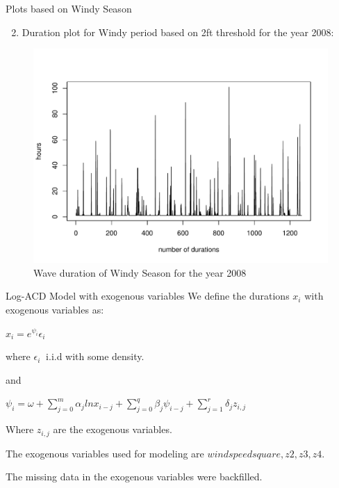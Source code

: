 \documentclass[
  ignorenonframetext,
]{beamer}
\providecommand{\tightlist}{%
  \setlength{\itemsep}{0pt}\setlength{\parskip}{0pt}}
\begin{document}
\begin{frame}{Plots based on Windy Season}
\protect\hypertarget{plots-based-on-windy-season}{}
\begin{enumerate}
[1)]
\setcounter{enumi}{1}
\tightlist
\item
  Duration plot for Windy period based on 2ft threshold for the year
  2008:
\end{enumerate}

\begin{figure}
\includegraphics[width=1\linewidth]{Picture2} \caption{Wave duration of Windy Season for the year 2008}\label{fig:Windy Season}
\end{figure}
\end{frame}

\begin{frame}{Log-ACD Model with exogenous variables}
\protect\hypertarget{log-acd-model-with-exogenous-variables}{}
We define the durations \(x_i\) with exogenous variables as:

\(x_i = e^{\psi_i} \epsilon_i\)

where \(\epsilon_i ~\) i.i.d with some density.

and

\(\psi_i = \omega + \sum_{j=0}^m \alpha_j ln x_{i-j} + \sum_{j=0}^q \beta_j \psi_{i-j}+\sum_{j=1}^r\delta_jz_{i,j}\)

Where \(z_{i,j}\) are the exogenous variables.

The exogenous variables used for modeling are
\(wind speed square, z2, z3, z4\).

The missing data in the exogenous variables were backfilled.
\end{frame}
\end{document}
